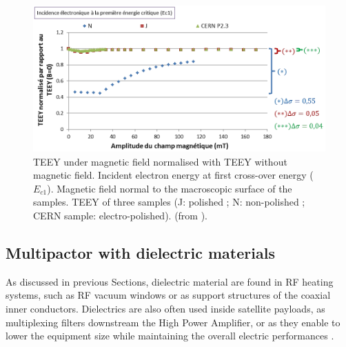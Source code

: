 \begin{figure}
	\centering
	\includegraphics[width=1.0\linewidth]{figures/chap4/TEEY_Cu_magnetic_field}
	\caption{TEEY under magnetic field normalised with TEEY without magnetic field. Incident electron energy at first cross-over energy ($E_{c1}$). Magnetic field normal to the macroscopic surface of the samples. TEEY of three samples (J: polished ; N: non-polished ; CERN sample: electro-polished). (from ).}
	\label{fig:teeycumagneticfield}
\end{figure}


\subsection[Influence of Dielectric]{Multipactor with dielectric materials} \label{sec:multipactor_dielectric}
As discussed in previous Sections, dielectric material are found in RF heating systems, such as RF vacuum windows or as support structures of the coaxial inner conductors.  Dielectrics are also often used inside satellite payloads, as multiplexing filters downstream the High Power Amplifier, or as they enable to lower the equipment size while maintaining the overall electric performances . 


